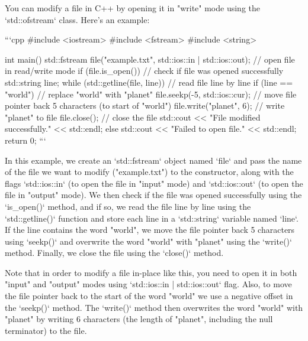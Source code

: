 You can modify a file in C++ by opening it in "write" mode using the `std::ofstream` class. Here's an example:

```cpp
#include <iostream>
#include <fstream>
#include <string>

int main() {
    std::fstream file("example.txt", std::ios::in | std::ios::out); // open file in read/write mode
    if (file.is_open()) { // check if file was opened successfully
        std::string line;
        while (std::getline(file, line)) { // read file line by line
            if (line == "world") { // replace "world" with "planet"
                file.seekp(-5, std::ios::cur); // move file pointer back 5 characters (to start of "world")
                file.write("planet", 6); // write "planet" to file
            }
        }
        file.close(); // close the file
        std::cout << "File modified successfully." << std::endl;
    }
    else {
        std::cout << "Failed to open file." << std::endl;
    }
    return 0;
}
```

In this example, we create an `std::fstream` object named `file` and pass the name of the file we want to modify ("example.txt") to the constructor, along with the flags `std::ios::in` (to open the file in "input" mode) and `std::ios::out` (to open the file in "output" mode). We then check if the file was opened successfully using the `is_open()` method, and if so, we read the file line by line using the `std::getline()` function and store each line in a `std::string` variable named `line`. If the line contains the word "world", we move the file pointer back 5 characters using `seekp()` and overwrite the word "world" with "planet" using the `write()` method. Finally, we close the file using the `close()` method.

Note that in order to modify a file in-place like this, you need to open it in both "input" and "output" modes using `std::ios::in | std::ios::out` flag. Also, to move the file pointer back to the start of the word "world" we use a negative offset in the `seekp()` method. The `write()` method then overwrites the word "world" with "planet" by writing 6 characters (the length of "planet", including the null terminator) to the file.
